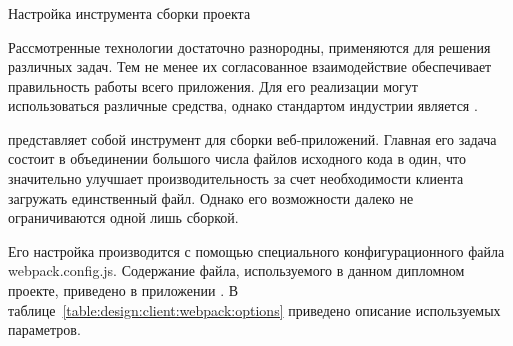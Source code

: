 \subsubsection{} Настройка инструмента сборки проекта
\label{sec:design:client:webpack}

Рассмотренные технологии достаточно разнородны, применяются для решения различных задач. Тем не менее их согласованное взаимодействие обеспечивает правильность работы всего приложения. Для его реализации могут использоваться различные средства, однако стандартом индустрии является \webpack. 

\webpack представляет собой инструмент для сборки веб-приложений. Главная его задача состоит в объединении большого числа файлов исходного кода в один, что значительно улучшает производительность за счет необходимости клиента загружать единственный файл. Однако его возможности далеко не ограничиваются одной лишь сборкой.

Его настройка производится с помощью специального конфигурационного файла webpack.config.js. Содержание файла, используемого в данном дипломном проекте, приведено в приложении \configfilesappendix. В таблице~\ref{table:design:client:webpack:options} приведено описание используемых параметров.

